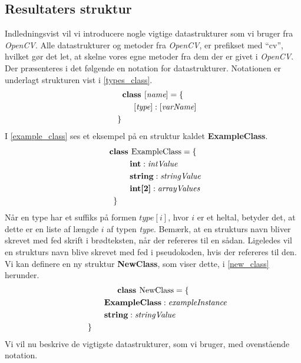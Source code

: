 {\subsection{Resultaters struktur\label{resultat_struktur}}
Indledningsvist vil vi introducere nogle vigtige datastrukturer som vi
bruger fra \emph{OpenCV}. Alle datastrukturer og metoder fra
\emph{OpenCV}, er prefikset med ``cv'', hvilket gør det let, at skelne
vores egne metoder fra dem der er givet i \emph{OpenCV}.  Der
præsenteres i det følgende en notation for datastrukturer.  Notationen
er underlagt strukturen vist i \eqref{types_class}.
\begin{multline}
    \textbf{class~} [\textit{name}] = \{ \\
    \shoveleft{\qquad[\textit{type}] : [\textit{varName}]} \\
    \shoveleft{\}}\shoveright{}
    \label{types_class}
\end{multline}
I \eqref{example_class} ses et eksempel på en struktur kaldet
\textbf{ExampleClass}.
\begin{multline}
    \textbf{class~} \textrm{ExampleClass} = \{ \\
    \shoveleft{\qquad\textbf{int} : \textit{intValue}} \\
    \shoveleft{\qquad\textbf{string} : \textit{stringValue}} \\
    \shoveleft{\qquad\textbf{int[2]} : \textit{arrayValues}} \\
    \shoveleft{\}}\shoveright{}
    \label{example_class}
\end{multline}
Når en type har et suffiks på formen $\textit{type}[i]$, hvor $i$ er et
heltal, betyder det, at dette er en liste af længde $i$ af typen
\textit{type}.  Bemærk, at en strukturs navn bliver skrevet med fed
skrift i brødteksten, når der refereres til en sådan. Ligeledes vil en
strukturs navn blive skrevet med fed i pseudokoden, hvis der refereres
til den. Vi kan definere en ny struktur \textbf{NewClass}, som viser
dette, i \eqref{new_class} herunder.
\begin{multline}
    \textbf{class~} \textrm{NewClass} = \{ \\
    \shoveleft{\qquad\textbf{ExampleClass} : \textit{exampleInstance}} \\
    \shoveleft{\qquad\textbf{string} : \textit{stringValue}} \\
    \shoveleft{\}}\shoveright{}
    \label{new_class}
\end{multline}
Vi vil nu beskrive de vigtigste datastrukturer, som vi bruger, med
ovenstående notation.

}
